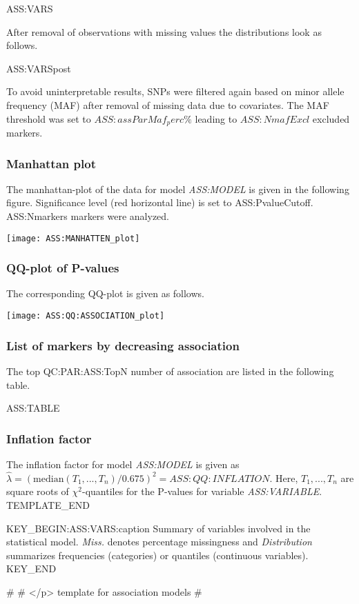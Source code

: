ASS:VARS

After removal of observations with missing values the distributions look as follows.

ASS:VARSpost

To avoid uninterpretable results, SNPs were filtered again based on minor allele frequency (MAF) after removal of missing data due to covariates. The MAF threshold was set to $ASS:assParMaf_perc\%$ leading to $ASS:NmafExcl$ excluded markers.

\subsubsection{Manhattan plot}

The manhattan-plot of the data for model \emph{ASS:MODEL} is given in the following figure. Significance level (red horizontal line) is set to ASS:PvalueCutoff. ASS:Nmarkers markers were analyzed.

\begin{center}
	\texttt{[image: ASS:MANHATTEN\_plot]}
\end{center}

\subsubsection{QQ-plot of P-values}

The corresponding QQ-plot is given as follows.

\begin{center}
	\texttt{[image: ASS:QQ:ASSOCIATION\_plot]}
\end{center}

\subsubsection{List of markers by decreasing association}

The top QC:PAR:ASS:TopN number of association are listed in the following table.

ASS:TABLE

\subsubsection{Inflation factor}

The inflation factor for model \emph{ASS:MODEL} is given as $\hat \lambda = (\mathrm{median}(T_1, ..., T_n)/0.675)^2 = ASS:QQ:INFLATION$. Here, $T_1, ..., T_n$ are square roots of $\chi^2$-quantiles for the P-values for variable \emph{ASS:VARIABLE}.
TEMPLATE_END

KEY_BEGIN:ASS:VARS:caption
Summary of variables involved in the statistical model. {\it Miss.} denotes percentage missingness and {\it Distribution} summarizes frequencies (categories) or quantiles (continuous variables).
KEY_END

#
#	</p> template for association models
#
